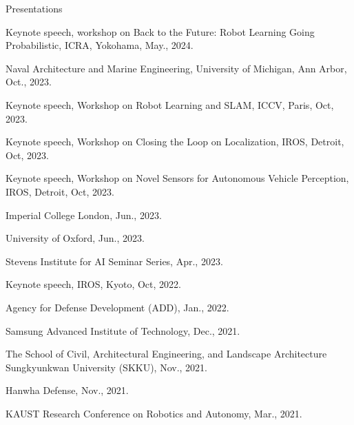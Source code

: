 \begin{rSection}{Presentations}
\begin{pubSubsectionNum}{}
  \item Keynote speech, workshop on Back to the Future: Robot Learning Going Probabilistic, ICRA, Yokohama, May., 2024.

  \item Naval Architecture and Marine Engineering, University of Michigan, Ann Arbor, Oct., 2023.

  \item Keynote speech, Workshop on Robot Learning and SLAM, ICCV, Paris, Oct, 2023.

  \item Keynote speech, Workshop on Closing the Loop on Localization, IROS, Detroit, Oct, 2023.

  \item Keynote speech, Workshop on Novel Sensors for Autonomous Vehicle Perception, IROS, Detroit, Oct, 2023.

  \item Imperial College London, Jun., 2023.

  \item University of Oxford, Jun., 2023.

  \item Stevens Institute for AI Seminar Series, Apr., 2023.

  \item Keynote speech, IROS, Kyoto, Oct, 2022.

  \item Agency for Defense Development (ADD), Jan., 2022.

  \item Samsung Advanced Institute of Technology, Dec., 2021.

  \item The School of Civil, Architectural Engineering, and Landscape Architecture
Sungkyunkwan University (SKKU), Nov., 2021.

  \item Hanwha Defense, Nov., 2021.



  \item KAUST Research Conference on Robotics and Autonomy, Mar., 2021.



\end{pubSubsectionNum}
\end{rSection}
